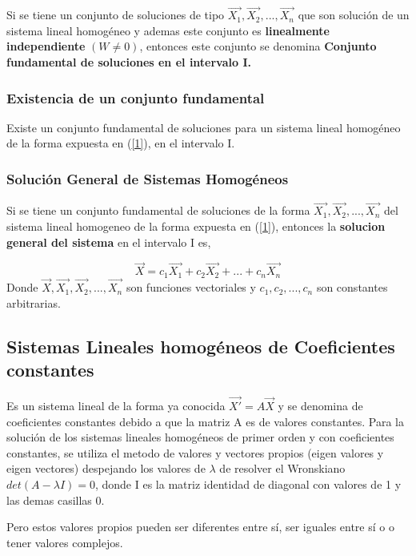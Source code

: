 \documentclass[titlepage]{article}
\begin{document}
            Si se tiene un conjunto de soluciones de tipo $\vec{X_1},\vec{X_2},...,\vec{X_n}$ que son solución de un sistema lineal homogéneo y ademas este conjunto es \textbf{linealmente independiente} $(W \neq 0)$, entonces este conjunto se denomina \textbf{Conjunto fundamental de soluciones en el intervalo I.} \cite{Zill2002a}
          
        \subsubsection{Existencia de un conjunto fundamental}  
            Existe un conjunto fundamental de soluciones para un sistema lineal homogéneo de la forma expuesta en  (\ref{1}), en el intervalo I.
            
        \subsubsection{Solución General de Sistemas Homogéneos} 
            Si se tiene un conjunto fundamental de soluciones de la forma $\vec{X_1},\vec{X_2},...,\vec{X_n}$ del sistema lineal homogeneo de la forma expuesta en  (\ref{1}), entonces la \textbf{solucion general del sistema} en el intervalo I es,
            
                \begin{equation*}
                    \vec{X} = c_1\vec{X_1} + c_2\vec{X_2} +...+ c_n\vec{X_n}
                \end{equation*}
            Donde $\vec{X},\vec{X_1},\vec{X_2},...,\vec{X_n}$ son funciones vectoriales y $c_1,c_2,...,c_n$ son constantes arbitrarias.
            
    \subsection{Sistemas Lineales homogéneos de Coeficientes constantes}
            
        Es un sistema lineal de la forma ya conocida $\vec{X'} = A\vec{X}$ y se denomina de coeficientes constantes debido a que la matriz A es de valores constantes.
        Para la solución de los sistemas lineales homogéneos de primer orden y con coeficientes constantes, se utiliza el metodo de valores y vectores propios (eigen valores y eigen vectores) despejando los valores de $\lambda$ de resolver el Wronskiano $det(A-\lambda I) = 0 $, donde I es la matriz identidad de diagonal con valores de 1 y las demas casillas 0.\par\vspace{0.2cm} 
        Pero estos valores propios pueden ser diferentes entre sí, ser iguales entre sí o o tener valores complejos. 
            
\end{document}
